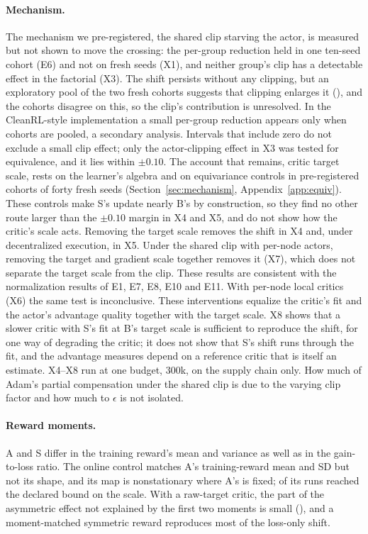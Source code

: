 \paragraph{Mechanism.} The mechanism we pre-registered, the shared clip starving the actor, is measured but not
shown to move the crossing: the per-group reduction held in one ten-seed cohort (E6) and not on fresh seeds (X1), and
neither group's clip has a detectable effect in the factorial (X3). The shift persists without any clipping, but an
exploratory pool of the two fresh cohorts suggests that clipping enlarges it (\VxeDiff{}), and the cohorts disagree on
this, so the clip's contribution is unresolved. In the CleanRL-style implementation a small per-group reduction
appears only when cohorts are pooled, a secondary analysis. Intervals that include zero do not
exclude a small clip effect; only the actor-clipping effect in X3 was tested for equivalence, and it lies within $\pm0.10$. The account that
remains, critic target scale, rests on the learner's algebra and on equivariance controls in pre-registered cohorts of forty fresh seeds (Section~\ref{sec:mechanism}, Appendix~\ref{app:equiv}). These controls make S's update nearly B's by construction, so they find no other route larger than the $\pm0.10$ margin in X4 and X5, and do not show how the critic's scale acts. Removing the target
scale removes the shift in X4 and, under decentralized execution, in X5. Under the shared clip with per-node actors,
removing the target and gradient scale together removes it (X7), which does not separate the target scale from the clip.
These results are consistent with the normalization results of E1, E7, E8, E10 and E11. With per-node local critics (X6) the same test is
inconclusive. These interventions equalize the critic's fit and the actor's advantage quality together with the target
scale. X8 shows that a slower critic with S's fit at B's target scale is sufficient to reproduce the shift, for one way of
degrading the critic; it does not show that S's shift runs through the fit, and the advantage measures depend on a reference
critic that is itself an estimate. X4--X8 run at one budget, 300k, on the supply chain only. How much
of Adam's partial compensation under the shared clip is due to the varying clip factor and how much to $\epsilon$ is
not isolated.

\paragraph{Reward moments.} A and S differ in the training reward's mean and variance as well as in the
gain-to-loss ratio. The online control matches A's training-reward mean and SD but not its shape, and its map is
nonstationary where A's is fixed; \VeightClamp{} of its \VeightNA{} runs reached the declared bound on the scale.
With a raw-target critic, the part of the asymmetric effect not explained by the first two moments is small
(\VeightAMonPlain{}), and a moment-matched symmetric reward reproduces most of the loss-only shift.


